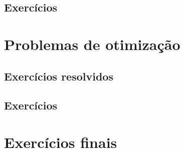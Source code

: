 \construirExeresol


\subsection*{Exercícios}

\construirExer


\section{Problemas de otimização}
\construirSec

\subsection*{Exercícios resolvidos}

\construirExeresol


\subsection*{Exercícios}

\construirExer


\section{Exercícios finais}

\construirExer


